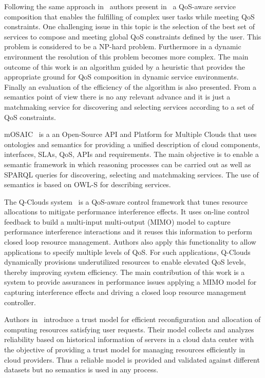 Following the same approach in~\cite{Mabrouk:2009:SEQ:1564601.1564724} authors 
present in~\cite{Mabrouk:2009:QSC:1656980.1656990} a QoS-aware service 
composition that enables the fulfilling of complex user tasks while meeting QoS 
constraints. One challenging issue in this topic is the selection of the best 
set of services to compose and meeting global QoS constraints defined by the 
user. This problem is considered to be a NP-hard problem. Furthermore in a 
dynamic environment the resolution of this problem becomes more complex. The 
main outcome of this work is an algorithm guided by a heuristic that provides 
the appropriate ground for QoS composition in dynamic service environments. 
Finally an evaluation of the efficiency of the algorithm is also presented. From 
a semantics point of view there is no any relevant advance and it is just a 
matchmaking service for discovering and selecting services according to a set of 
QoS constraints.

mOSAIC~\cite{Cretella:2012:UMS:2428736.2428805} is a an Open-Source API and 
Platform for Multiple Clouds that uses ontologies and semantics for providing a 
unified description of cloud components, interfaces, SLAs, QoS, APIs and 
requirements. The main objective is to enable a semantic framework in which 
reasoning processes can be carried out as well as SPARQL queries for 
discovering, selecting and matchmaking services. The use of semantics is based 
on OWL-S for describing services. 

The Q-Clouds system~\cite{Nathuji:2010:QMP:1755913.1755938} is a QoS-aware 
control framework that tunes resource allocations to mitigate performance 
interference effects. It uses on-line control feedback to build a multi-input 
multi-output (MIMO) model to capture performance interference interactions and 
it reuses this information to perform closed loop resource management. Authors 
also apply this functionality to allow applications to specify multiple levels 
of QoS. For such applications, Q-Clouds dynamically provisions underutilized 
resources to enable elevated QoS levels, thereby improving system efficiency. 
The main contribution of this work is a system to provide assurances in 
performance issues applying a MIMO model for capturing interference effects and 
driving a closed loop resource management controller.

Authors in~\cite{DBLP:journals/ijguc/Chang11} introduce a trust model for 
efficient reconfiguration and allocation of computing resources satisfying user 
requests. Their model collects and analyzes reliability based on historical 
information of servers in a cloud data center with the objective of providing a 
trust model for managing resources efficiently in cloud providers. Thus a 
reliable model is provided and validated against different datasets but no 
semantics is used in any process. 

